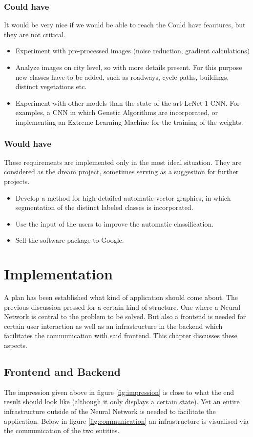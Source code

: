\documentclass[a4paper,onecolumn]{report}
\begin{document}
\subsection{Could have}
It would be very nice if we would be able to reach the Could have feautures, but they are not critical. 
\begin{itemize}
\item Experiment with pre-processed images (noise reduction, gradient calculations)
\item Analyze images on city level, so with more details present. For this purpose new classes have to be added, such as roadways, cycle paths, 	buildings, distinct vegetations etc. 
\item Experiment with other models than the state-of-the art LeNet-1 CNN. For examples, a CNN in which Genetic Algorithms are incorporated, or implementing an Extreme Learning Machine for the training of the weights. 
\end{itemize}

\subsection{Would have}
These requirements are implemented only in the most ideal situation. They are considered as the dream project, sometimes serving as a suggestion for further projects. 

\begin{itemize}
\item Develop a method for high-detailed automatic vector graphics, in which segmentation of the distinct labeled classes is incorporated.
\item Use the input of the users to improve the automatic classification. 
\item Sell the software package to Google. 
\end{itemize}

\chapter{Implementation}
A plan has been established what kind of application should come about. The previous discussion pressed for a certain kind of structure. One where a Neural Network is central to the problem to be solved. But also a frontend is needed for certain user interaction as well as an infrastructure in the backend which facilitates the communication with said frontend. This chapter discusses these aspects.

\section{Frontend and Backend}
The impression given above in figure \ref{fig:impression} is close to what the end result should look like (although it only displays a certain state). Yet an entire infrastructure outside of the Neural Network is needed to facilitate the application. Below in figure \ref{fig:communication} an infrastructure is visualised via the communication of the two entities.
\end{document}
